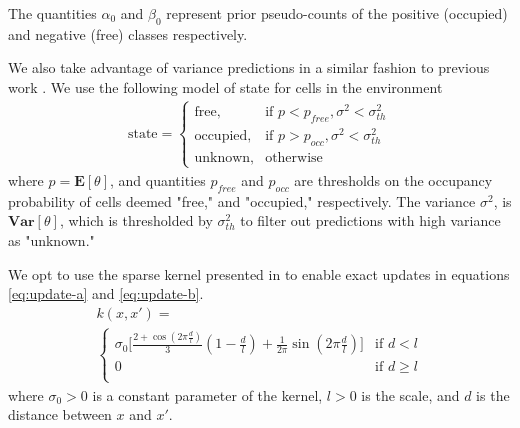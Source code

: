 \documentclass[portrait,final,archD,fontscale=0.477]{baposter}
\begin{document}
\begin{poster}
{The quantities $\alpha_0$ and $\beta_0$ represent prior pseudo-counts of the positive (occupied) and negative (free) classes respectively.

We also take advantage of variance predictions in a similar fashion to previous work \cite{jwang}. We use the following model of state for cells in the environment
\begin{align}
	\text{state} = \begin{cases} \text{free,} & \text{if }p < p_{free}, \sigma^2 < \sigma^2_{th} \\
	\text{occupied,} & \text{if } p > p_{occ}, \sigma^2 < \sigma^2_{th} \\
	\text{unknown,} & \text{otherwise} \end{cases}
\end{align}
where $p = \mathbf{E}[\theta]$, and quantities $p_{free}$ and $p_{occ}$ are thresholds on the occupancy probability of cells deemed "free," and "occupied," respectively. The variance $\sigma^2$, is $\mathbf{Var}[\theta]$, which is thresholded by $\sigma^2_{th}$ to filter out predictions with high variance as "unknown."

We opt to use the sparse kernel presented in \cite{sparsekernel} to enable exact updates in equations \ref{eq:update-a} and \ref{eq:update-b}.
\begin{multline}
    k(x,x') = \\ \begin{cases}
        \sigma_0\big[\frac{2 + \cos(2\pi\frac{d}{l})}{3}(1 - \frac{d}{l}) + \frac{1}{2\pi}\sin(2\pi\frac{d}{l})\big] & \text{if } d < l\\
        0 & \text{if } d\geq l\\ \label{eq:sparse-kern}
        \end{cases}
\end{multline}
where $\sigma_0 > 0$ is a constant parameter of the kernel, $l > 0$ is the scale, and $d$ is the distance between $x$ and $x'$. 
}

\end{poster}
\end{document}
